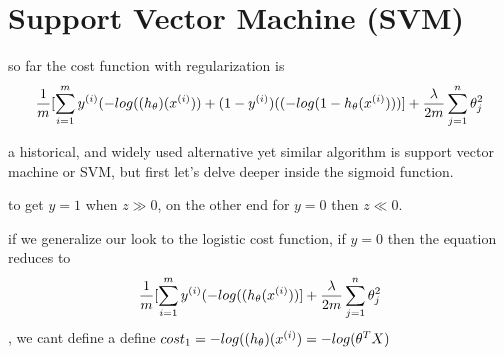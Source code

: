 \documentclass[4apaper,12pt]{book}
\begin{document}
  \section{Support Vector Machine (SVM)}
  \begin{description}
  \item so far the cost function with regularization is $$\frac{1}{m}[\sum_{i=1}^my^{(i)}(-log(\text( h_{\theta})(x^{(i)})) + (1-y^{(i)}) ((-log(1-h_{\theta}(x^{(i)})))] + \frac{\lambda}{2m}\sum_{j=1}^n\theta_j^2 $$
  \item a historical, and widely used alternative yet similar algorithm is support vector machine or SVM, but first let's delve deeper inside the sigmoid function.

  \item {}
    \hskip 5pt
  \item to get $y=1$ when $z\gg0$, on the other end for $y=0$ then $z\ll0$.
  \item if we generalize our look to the logistic cost function, if $y=0$ then the equation reduces to  $$\frac{1}{m}[\sum_{i=1}^my^{(i)}(-log(\text( h_{\theta}(x^{(i)}))] + \frac{\lambda}{2m}\sum_{j=1}^n\theta_j^2 $$, we cant define a define $cost_1=-log(\text( h_{\theta})(x^{(i)})=-log(\theta^TX)$
  \item {}
    \begin{tikzpicture}

\end{tikzpicture}
\end{description}
\end{document}
